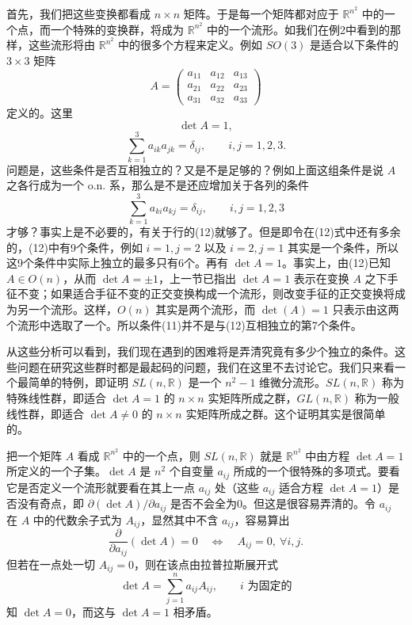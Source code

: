 首先，我们把这些变换都看成 $n\times n$ 矩阵。于是每一个矩阵都对应于 $\mathbb R^{n^2}$ 中的一个点，而一个特殊的变换群，将成为 $\mathbb R^{n^2}$ 中的一个流形。如我们在例2中看到的那样，这些流形将由 $\mathbb R^{n^2}$ 中的很多个方程来定义。例如 $SO(3)$ 是适合以下条件的 $3\times3$ 矩阵
\[
 A=\begin{pmatrix}
 a_{11}&a_{12}&a_{13}\\
 a_{21}&a_{22}&a_{23}\\
 a_{31}&a_{32}&a_{33}
 \end{pmatrix}
\]
定义的。这里
\begin{equation}
 \det A=1,
 \tag{11}
\end{equation}
\begin{equation}
 \sum_{k=1}^{3}a_{ik}a_{jk}=\delta_{ij},
 \qquad i,j=1,2,3.
 \tag{12}
\end{equation}
问题是，这些条件是否互相独立的？又是不是足够的？例如上面这组条件是说 $A$ 之各行成为一个 o.n. 系，那么是不是还应增加关于各列的条件
\[
 \sum_{k=1}^{3}a_{ki}a_{kj}=\delta_{ij},\qquad i,j=1,2,3
\]
才够？事实上是不必要的，有关于行的(12)就够了。但是即令在(12)式中还有多余的，(12)中有9个条件，例如 $i=1,j=2$ 以及 $i=2,j=1$ 其实是一个条件，所以这9个条件中实际上独立的最多只有6个。再有 $\det A=1$。事实上，由(12)已知 $A\in O(n)$，从而 $\det A=\pm1$，上一节已指出 $\det A=1$ 表示在变换 $A$ 之下手征不变；如果适合手征不变的正交变换构成一个流形，则改变手征的正交变换将成为另一个流形。这样，$O(n)$ 其实是两个流形，而 $\det(A)=1$ 只表示由这两个流形中选取了一个。所以条件(11)并不是与(12)互相独立的第7个条件。

从这些分析可以看到，我们现在遇到的困难将是弄清究竟有多少个独立的条件。这些问题在研究这些群时都是最起码的问题，我们在这里不去讨论它。我们只来看一个最简单的特例，即证明 $SL(n,\mathbb R)$ 是一个 $n^2-1$ 维微分流形。$SL(n,\mathbb R)$ 称为特殊线性群，即适合 $\det A=1$ 的 $n\times n$ 实矩阵所成之群，$GL(n,\mathbb R)$ 称为一般线性群，即适合 $\det A\ne0$ 的 $n\times n$ 实矩阵所成之群。这个证明其实是很简单的。

把一个矩阵 $A$ 看成 $\mathbb R^{n^2}$ 中的一个点，则 $SL(n,\mathbb R)$ 就是 $\mathbb R^{n^2}$ 中由方程 $\det A=1$ 所定义的一个子集。$\det A$ 是 $n^2$ 个自变量 $a_{ij}$ 所成的一个很特殊的多项式。要看它是否定义一个流形就要看在其上一点 $a_{ij}$ 处（这些 $a_{ij}$ 适合方程 $\det A=1$）是否没有奇点，即 $\partial(\det A)/\partial a_{ij}$ 是否不会全为0。但这是很容易弄清的。令 $a_{ij}$ 在 $A$ 中的代数余子式为 $A_{ij}$，显然其中不含 $a_{ij}$，容易算出
\[
 \frac{\partial}{\partial a_{ij}}(\det A)=0
 \quad\Longleftrightarrow\quad
 A_{ij}=0,\ \forall i,j.
\]
但若在一点处一切 $A_{ij}=0$，则在该点由拉普拉斯展开式
\[
 \det A=\sum_{j=1}^{n}a_{ij}A_{ij},\qquad i\text{ 为固定的}
\]
知 $\det A=0$，而这与 $\det A=1$ 相矛盾。

